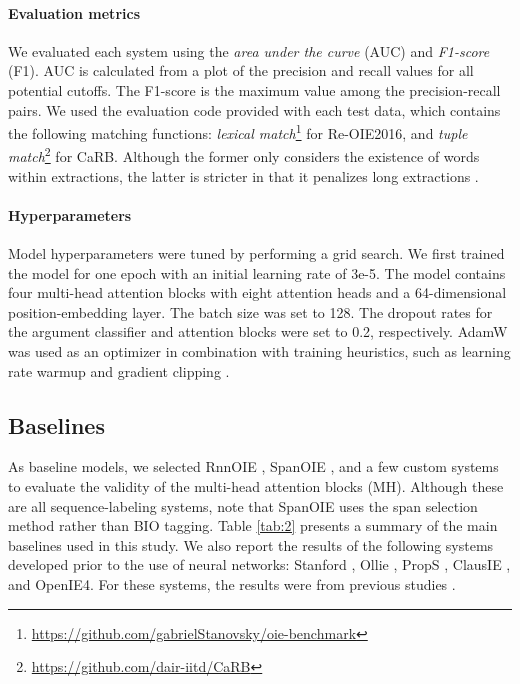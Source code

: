\documentclass[11pt,a4paper]{article}
\begin{document}
\paragraph{Evaluation metrics}
We evaluated each system using the \emph{area under the curve} (AUC) and \emph{F1-score} (F1).
AUC is calculated from a plot of the precision and recall values for all potential cutoffs.
The F1-score is the maximum value among the precision-recall pairs.
We used the evaluation code provided with each test data, which contains the following matching functions: \emph{lexical match}\footnote{\url{https://github.com/gabrielStanovsky/oie-benchmark}} for Re-OIE2016, and \emph{tuple match}\footnote{\url{https://github.com/dair-iitd/CaRB}} for CaRB.
Although the former only considers the existence of words within extractions, the latter is stricter in that it penalizes long extractions \citep{bhardwaj-etal-2019-carb}.

\paragraph{Hyperparameters}
Model hyperparameters were tuned by performing a grid search.
We first trained the model for one epoch with an initial learning rate of 3e-5.
The model contains four multi-head attention blocks with eight attention heads and a 64-dimensional position-embedding layer.
The batch size was set to 128.
The dropout rates for the argument classifier and attention blocks were set to 0.2, respectively.
AdamW \citep{Loshchilov2019DecoupledWD} was used as an optimizer in combination with training heuristics, such as learning rate warmup \citep{Goyal2017AccurateLM} and gradient clipping \citep{10.5555/3042817.3043083}.

\subsection{Baselines}
As baseline models, we selected RnnOIE \citep{stanovsky-etal-2018-supervised}, SpanOIE \citep{Zhan2019SpanMF}, and a few custom systems to evaluate the validity of the multi-head attention blocks (MH).
Although these are all sequence-labeling systems, note that SpanOIE uses the span selection method rather than BIO tagging.
Table \ref{tab:2} presents a summary of the main baselines used in this study.
We also report the results of the following systems developed prior to the use of neural networks: Stanford \citep{angeli-etal-2015-leveraging}, O{\sc llie} \citep{mausam-etal-2012-open}, P{\sc rop}S \citep{Stanovsky2016GettingMO}, ClausIE \citep{10.1145/2488388.2488420}, and OpenIE4.
For these systems, the results were from previous studies \citep{Zhan2019SpanMF,bhardwaj-etal-2019-carb}.
\end{document}
